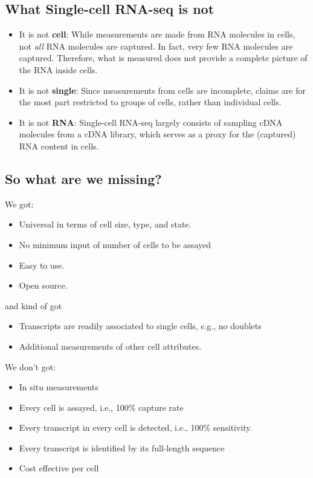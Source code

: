 \documentclass[10pt]{article}
\begin{document}
\subsection*{What Single-cell RNA-seq is not}
\begin{itemize}
    \item It is not \textbf{cell}: While measurements are made from RNA molecules in cells, not \textit{all} RNA molecules are captured.  In fact, very few RNA molecules are captured.  Therefore, what is measured does not provide a complete picture of the RNA inside cells.
    \item It is not \textbf{single}: Since measurements from cells are incomplete, claims are for the most part restricted to groups of cells, rather than individual cells.
    \item It is not \textbf{RNA}: Single-cell RNA-seq largely consists of sampling cDNA molecules from a cDNA library, which serves as a proxy for the (captured) RNA content in cells.
\end{itemize}

\subsection*{So what are we missing?}
We got:
\begin{itemize}
    \item Universal in terms of cell size, type, and state.
    \item No minimum input of number of cells to be assayed
    \item Easy to use.
    \item Open source.
\end{itemize}
and kind of got
\begin{itemize}
    \item Transcripts are readily associated to single cells, e.g., no doublets
    \item Additional measurements of other cell attributes.
\end{itemize}
We don't got:
\begin{itemize}
    \item In situ measurements
    \item Every cell is assayed, i.e., 100\% capture rate
    \item Every transcript in every cell is detected, i.e., 100\% sensitivity.
    \item Every transcript is identified by its full-length sequence
    \item Cost effective per cell
\end{itemize}
\end{document}

